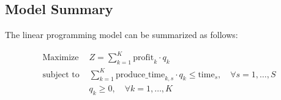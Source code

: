 \documentclass{article}
\begin{document}
\subsection*{Model Summary}
The linear programming model can be summarized as follows:

\begin{align*}
\text{Maximize } & Z = \sum_{k=1}^{K} \text{profit}_{k} \cdot q_k \\
\text{subject to } & \sum_{k=1}^{K} \text{produce\_time}_{k, s} \cdot q_k \leq \text{time}_{s}, \quad \forall s = 1, \ldots, S \\
& q_k \geq 0, \quad \forall k = 1, \ldots, K
\end{align*}
\end{document}
